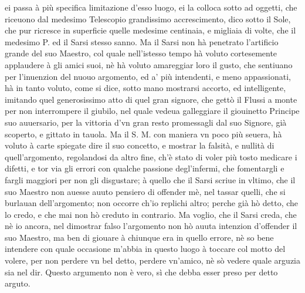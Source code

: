 \documentclass[11pt,twoside,openany]{book}
\begin{document}
ei passa à più specifica limitazione d'esso luogo, ei la colloca sotto ad oggetti, che riceuono dal medesimo Telescopio grandissimo accrescimento, dico sotto il Sole, che pur ricresce in superficie quelle medesime centinaia, e migliaia di volte, che il medesimo P. ed il Sarsi stesso sanno. Ma il Sarsi non hà penetrato l'artificio grande del suo Maestro, col quale nell'istesso tempo hà voluto cortesemente applaudere à gli amici suoi, nè hà voluto amareggiar loro il gusto, che sentiuano per l'inuenzion del nuouo argomento, ed a' più intendenti, e meno appassionati, hà in tanto voluto, come si dice, sotto mano mostrarsi accorto, ed intelligente, imitando quel generosissimo atto di quel gran signore, che gettò il Flussi a monte per non interrompere il giubilo, nel quale vedeua galleggiare il giouinetto Principe suo auuersario, per la vittoria d'vn gran resto promessagli dal suo Signore, già scoperto, e gittato in tauola. Ma il S. M. con maniera vn poco più seuera, hà voluto à carte spiegate dire il suo concetto, e mostrar la falsità, e nullità di quell'argomento, regolandosi da altro fine, ch'è stato di voler più tosto medicare i difetti, e tor via gli errori con qualche passione degl'infermi, che fomentargli e fargli maggiori per non gli disgustare; à quello che il Sarsi scriue in vltimo, che il suo Maestro non auesse auuto pensiero di offender mè, nel tassar quelli, che si burlauan dell'argomento; non occorre ch'io replichi altro; perche già hò detto, che lo credo, e che mai non hò creduto in contrario. Ma voglio, che il Sarsi creda, che nè io ancora, nel dimostrar falso l'argomento non hò auuta intenzion d'offender il suo Maestro, ma ben di giouare à chiunque era in quello errore, nè so bene intendere con quale occasione m'abbia in questo luogo à toccare col motto del volere, per non perdere vn bel detto, perdere vn'amico, nè sò vedere quale arguzia sia nel dir. Questo argumento non è vero, sì che debba esser preso per detto arguto.
\end{document}
